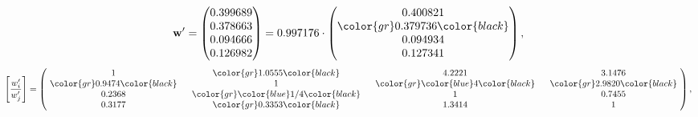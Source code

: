 \begin{example}
\begin{equation*}
\mathbf{w}^{\prime} =
\begin{pmatrix}
0.399689\\
0.378663\\
0.094666\\
0.126982
\end{pmatrix} =
0.997176\cdot
\begin{pmatrix}
0.400821\\
\color{gr} 0.379736\color{black} \\
0.094934\\
0.127341
\end{pmatrix},
\end{equation*}
\begin{equation*}
\left[ \frac{{w}^{\prime}_i}{{w}^{\prime}_j} \right] =
\begin{pmatrix}
$\,\,$ 1 $\,\,$ & $\,\,$\color{gr} 1.0555\color{black} $\,\,$ & $\,\,$4.2221$\,\,$ & $\,\,$3.1476$\,\,$ \\
$\,\,$\color{gr} 0.9474\color{black} $\,\,$ & $\,\,$ 1 $\,\,$ & $\,\,$\color{gr} \color{blue} 4\color{black} $\,\,$ & $\,\,$\color{gr} 2.9820\color{black}   $\,\,$ \\
$\,\,$0.2368$\,\,$ & $\,\,$\color{gr} \color{blue}  1/4\color{black} $\,\,$ & $\,\,$ 1 $\,\,$ & $\,\,$0.7455 $\,\,$ \\
$\,\,$0.3177$\,\,$ & $\,\,$\color{gr} 0.3353\color{black} $\,\,$ & $\,\,$1.3414$\,\,$ & $\,\,$ 1  $\,\,$ \\
\end{pmatrix},
\end{equation*}
\end{example}
\newpage
